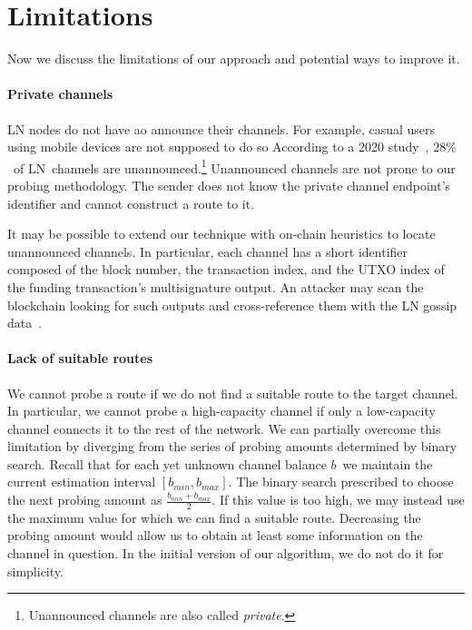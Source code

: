 \pagebreak

\section{Limitations}

Now we discuss the limitations of our approach and potential ways to improve it.

\paragraph{Private channels}

LN nodes do not have ao announce their channels.
For example, casual users using mobile devices are not supposed to do so
According to a 2020 study~\cite{BitMEXPrivateChannels}, $28\%$~of LN~channels are unannounced.\footnote{Unannounced channels are also called \textit{private}.}
Unannounced channels are not prone to our probing methodology.
The sender does not know the private channel endpoint's identifier and cannot construct a route to it.

It may be possible to extend our technique with on-chain heuristics to locate unannounced channels.
In particular, each channel has a short identifier composed of the block number, the transaction index, and the UTXO index of the funding transaction's multisignature output.
An attacker may scan the blockchain looking for such outputs and cross-reference them with the LN gossip data~\cite{Pickhardt2020}.

\paragraph{Lack of suitable routes}

We cannot probe a route if we do not find a suitable route to the target channel.
In particular, we cannot probe a high-capacity channel if only a low-capacity channel connects it to the rest of the network.
We can partially overcome this limitation by diverging from the series of probing amounts determined by binary search.
Recall that for each yet unknown channel balance $b$~we maintain the current estimation interval $[b_{min}, b_{max}]$.
The binary search prescribed to choose the next probing amount as $\frac{b_{min} + b_{max}}{2}$.
If this value is too high, we may instead use the maximum value for which we can find a suitable route.
Decreasing the probing amount would allow us to obtain at least some information on the channel in question.
In the initial version of our algorithm, we do not do it for simplicity.


